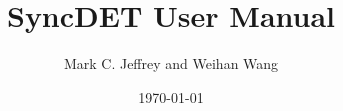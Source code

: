 \documentclass{article}
\begin{document}
\title{SyncDET User Manual}
\author{Mark C. Jeffrey and Weihan Wang}
\date{\today}

\maketitle
\tableofcontents





\end{document}
